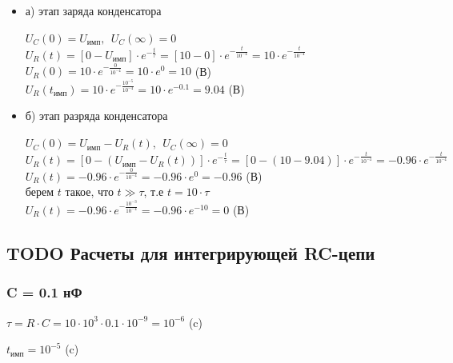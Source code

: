 \begin{itemize}
\item[] а) этап заряда конденсатора

		$U_C(0)	= U_\text{имп},\ \ U_C(\infty) = 0$\\		
		$U_R(t) = [0 - U_\text{имп}] \cdot e^{-\frac{t}{\tau}} = [10 - 0] \cdot e^{-\frac{t}{10^{-4}}} = 10 \cdot e^{-\frac{t}{10^{-4}}}$\\
		$U_R(0) = 10 \cdot e^{-\frac{0}{10^{-4}}} = 10 \cdot e^0 = 10$ (В)\\
		$U_R(t_\text{имп}) = 10 \cdot e^{-\frac{10^{-5}}{10^{-4}}} = 10 \cdot e^{-0.1} = 9.04$ (В)\\

\item[] б) этап разряда конденсатора
		
		$U_C(0)	= U_\text{имп} - U_R(t),\ \ U_C(\infty) = 0$\\
		$U_R(t) = [0 - (U_\text{имп} - U_R(t))] \cdot e^{-\frac{t}{\tau}} = [0 - (10 - 9.04)] \cdot e^{-\frac{t}{10^{-4}}} = -0.96 \cdot e^{-\frac{t}{10^{-4}}}$\\
		$U_R(t) = -0.96 \cdot e^{-\frac{0}{10^{-4}}} = -0.96 \cdot e^0 = -0.96$ (В)\\
		берем $t$ такое, что $t \gg \tau$, т.е $t = 10 \cdot \tau$ \\
		$U_R(t) = -0.96 \cdot e^{-\frac{10^{-3}}{10^{-4}}} = -0.96 \cdot e^{-10} = 0$ (В)\\
		
\end{itemize}

\subsection{TODO Расчеты для интегрирующей RC-цепи}

\subsubsection{C = 0.1 нФ}

		$\tau = R \cdot C = 10 \cdot 10^3 \cdot 0.1 \cdot 10^{-9} = 10^{-6}$ (c)
		
		$t_\text{имп} = 10^{-5}$ (c)
		
